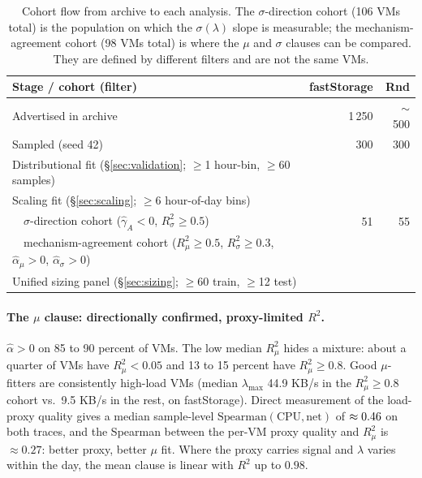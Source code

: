 \documentclass[11pt,a4paper]{article}
\begin{document}
\begin{table}[t]
  \centering
  \small
  \begin{tabular}{lrr}
    \toprule
    Stage / cohort (filter) & fastStorage & Rnd \\
    \midrule
    Advertised in archive               & 1\,250 & $\sim$500 \\
    Sampled (seed 42)                   & 300    & 300 \\
    Distributional fit (\S\ref{sec:validation}; $\geq$1 hour-bin, $\geq$60 samples) & \NVmsFs{} & \NVmsRnd{} \\
    Scaling fit (\S\ref{sec:scaling}; $\geq$6 hour-of-day bins)          & \ScalFsNVms{} & \ScalRnNVms{} \\
    ~~$\sigma$-direction cohort ($\hat\gamma_A<0$, $R^2_\sigma\geq0.5$)  & 51 & 55 \\
    ~~mechanism-agreement cohort ($R^2_\mu\geq0.5$, $R^2_{\sigma}\geq0.3$, $\hat\alpha_\mu>0$, $\hat\alpha_\sigma>0$) & \ScalFsCohortN{} & \ScalRnCohortN{} \\
    Unified sizing panel (\S\ref{sec:sizing}; $\geq$60 train, $\geq$12 test) & \PanelFsNVms{} & \PanelRnNVms{} \\
    \bottomrule
  \end{tabular}
  \caption{Cohort flow from archive to each analysis. The
    $\sigma$-direction cohort (106 VMs total) is the population on which
    the $\sigma(\lambda)$ slope is measurable; the mechanism-agreement
    cohort (98 VMs total) is where the $\mu$ and $\sigma$ clauses can be
    compared. They are defined by different filters and are not the same
    VMs.}
  \label{tab:cohorts}
\end{table}

\paragraph{The $\mu$ clause: directionally confirmed, proxy-limited $R^2$.}
$\hat\alpha > 0$ on 85 to 90 percent of VMs. The low median $R^2_\mu$ hides
a mixture: about a quarter of VMs have $R^2_\mu < 0.05$ and 13 to 15 percent
have $R^2_\mu \geq 0.8$. Good $\mu$-fitters are consistently high-load VMs
(median $\lambda_{\max}$ 44.9 KB/s in the $R^2_\mu \geq 0.8$ cohort vs.\
9.5 KB/s in the rest, on fastStorage). Direct measurement of the load-proxy
quality gives a median sample-level $\text{Spearman}(\text{CPU}, \text{net})$
of $\approx 0.46$ on both traces, and the Spearman between the per-VM
proxy quality and $R^2_\mu$ is $\approx 0.27$: better proxy, better $\mu$
fit. Where the proxy carries signal and $\lambda$ varies within the day,
the mean clause is linear with $R^2$ up to $0.98$.
\end{document}
